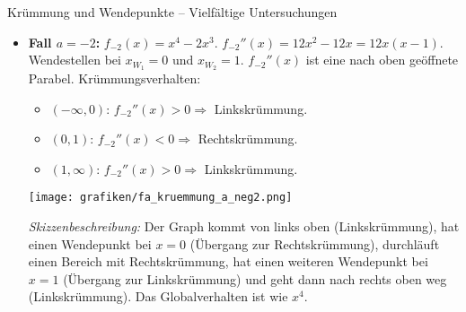 \begin{loesungsumgebung}{Krümmung und Wendepunkte – Vielfältige Untersuchungen}
\begin{enumerate}[label=(\alph*)]
\begin{itemize}
\begin{itemize}
\begin{center}
            \texttt{[image: grafiken/fa\_kruemmung\_a\_pos2.png]}
            \label{fig:fa_kruemmung_a_pos2}
            \end{center}
            \textit{Skizzenbeschreibung:} Der Graph kommt von links oben (Linkskrümmung), hat einen Wendepunkt bei $x=-1$ (Übergang zur Rechtskrümmung), durchläuft einen Bereich mit Rechtskrümmung, hat einen weiteren Wendepunkt bei $x=0$ (Übergang zur Linkskrümmung) und geht dann nach rechts oben weg (Linkskrümmung). Das Globalverhalten ist wie $x^4$.

            \item \textbf{Fall $a=-2$:} $f_{-2}(x) = x^4 - 2x^3$.
            $f_{-2}''(x) = 12x^2 - 12x = 12x(x-1)$.
            Wendestellen bei $x_W_1=0$ und $x_W_2=1$.
            $f_{-2}''(x)$ ist eine nach oben geöffnete Parabel.
            Krümmungsverhalten:
            \begin{itemize}
                \item $(-\infty, 0)$: $f_{-2}''(x) > 0 \Rightarrow$ Linkskrümmung.
                \item $(0, 1)$: $f_{-2}''(x) < 0 \Rightarrow$ Rechtskrümmung.
                \item $(1, \infty)$: $f_{-2}''(x) > 0 \Rightarrow$ Linkskrümmung.
            \end{itemize}
            \begin{center}
            \texttt{[image: grafiken/fa\_kruemmung\_a\_neg2.png]}
            \label{fig:fa_kruemmung_a_neg2}
            \end{center}
            \textit{Skizzenbeschreibung:} Der Graph kommt von links oben (Linkskrümmung), hat einen Wendepunkt bei $x=0$ (Übergang zur Rechtskrümmung), durchläuft einen Bereich mit Rechtskrümmung, hat einen weiteren Wendepunkt bei $x=1$ (Übergang zur Linkskrümmung) und geht dann nach rechts oben weg (Linkskrümmung). Das Globalverhalten ist wie $x^4$.
        \end{itemize}
    \end{itemize}
\end{enumerate}

\end{loesungsumgebung}


